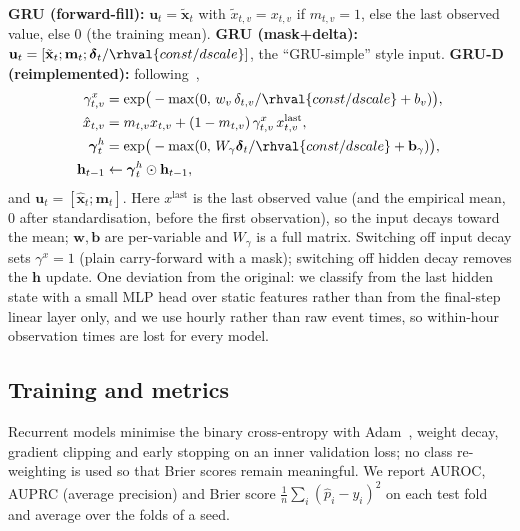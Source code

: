 \textbf{GRU (forward-fill):} $\mathbf{u}_t=\tilde{\mathbf{x}}_t$ with $\tilde x_{t,v}=x_{t,v}$ if $m_{t,v}=1$, else the last observed value, else $0$ (the training mean). \textbf{GRU (mask+delta):} $\mathbf{u}_t=[\tilde{\mathbf{x}}_t;\mathbf{m}_t;\boldsymbol\delta_t/\rhval{const/dscale}]$, the ``GRU-simple'' style input. \textbf{GRU-D (reimplemented):} following~\cite{che2016recurrent},
\begin{align}
\gamma^x_{t,v}&=\exp\!\big(-\max(0,\,w_v\,\delta_{t,v}/\rhval{const/dscale}+b_v)\big),\\
\hat x_{t,v}&=m_{t,v}x_{t,v}+(1-m_{t,v})\,\gamma^x_{t,v}\,x^{\mathrm{last}}_{t,v},\\
\boldsymbol\gamma^h_t&=\exp\!\big(-\max(0,\,W_\gamma\boldsymbol\delta_t/\rhval{const/dscale}+\mathbf{b}_\gamma)\big),\\
\mathbf{h}_{t-1}&\leftarrow\boldsymbol\gamma^h_t\odot\mathbf{h}_{t-1},
\end{align}
and $\mathbf{u}_t=[\hat{\mathbf{x}}_t;\mathbf{m}_t]$. Here $x^{\mathrm{last}}$ is the last observed value (and the empirical mean, $0$ after standardisation, before the first observation), so the input decays toward the mean; $\mathbf{w},\mathbf{b}$ are per-variable and $W_\gamma$ is a full matrix. Switching off input decay sets $\gamma^x=1$ (plain carry-forward with a mask); switching off hidden decay removes the $\mathbf{h}$ update. One deviation from the original: we classify from the last hidden state with a small MLP head over static features rather than from the final-step linear layer only, and we use hourly rather than raw event times, so within-hour observation times are lost for every model.

\subsection{Training and metrics}
Recurrent models minimise the binary cross-entropy with Adam~\cite{kingma2014adam}, weight decay, gradient clipping and early stopping on an inner validation loss; no class re-weighting is used so that Brier scores remain meaningful. We report AUROC, AUPRC (average precision) and Brier score $\frac1n\sum_i(\hat p_i-y_i)^2$ on each test fold and average over the folds of a seed.
